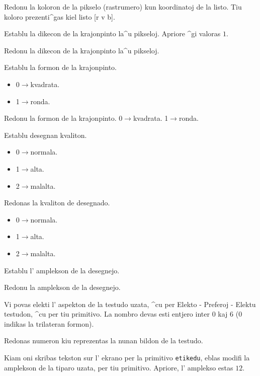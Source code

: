 Redonu la koloron de la pikselo (rastrumero) kun koordinatoj de la listo.
Tiu koloro prezenti^gas kiel listo [r v b].

Establu la dikecon de la krajonpinto la^u pikseloj.
Apriore ^gi valoras $1$.

Redonu la dikecon de la krajonpinto la^u pikseloj. 

Establu la formon de la krajonpinto.
\begin{itemize}
\item 0$\to$kvadrata.
\item 1$\to$ronda.
\end{itemize}
\noindent

Redonu la formon de la krajonpinto. 0$\to$kvadrata. 1$\to$ronda.

Establu desegnan kvaliton.
\begin{itemize}
 \item 0$\to$normala.
 \item 1$\to$alta.
 \item 2$\to$malalta.
\end{itemize}
\noindent

Redonas la kvaliton de desegnado.
\begin{itemize}
 \item 0$\to$normala.
 \item 1$\to$alta.
 \item 2$\to$malalta.
\end{itemize}
\noindent

Establu l' amplekson de la desegnejo.

Redonu la amplekson de la desegnejo.

Vi povas elekti l' aspekton de la testudo uzata, ^cu per Elekto - 
Preferoj - Elektu testudon, ^cu per tiu primitivo.  La nombro devas
esti entjero inter $0$ kaj $6$ ($0$ indikas la trilateran formon).

Redonas numeron kiu reprezentas la nunan bildon de la testudo.

Kiam oni skribas tekston sur l' ekrano per la primitivo \texttt{etikedu},
eblas modifi la amplekson de la tiparo uzata, per tiu primitivo.
Apriore, l' amplekso estas $12$.

